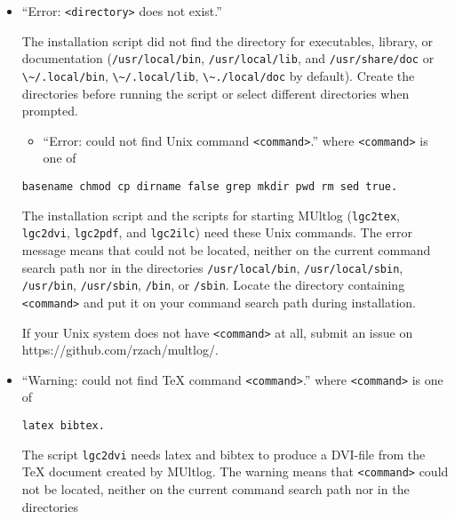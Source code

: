 \documentclass[
]{article}
\newcommand{\passthrough}[1]{#1}
\providecommand{\tightlist}{%
  \setlength{\itemsep}{0pt}\setlength{\parskip}{0pt}}
\begin{document}
\begin{itemize}
\item
  ``Error: \passthrough{\lstinline!<directory>!} does not exist.''

  The installation script did not find the directory for executables,
  library, or documentation (\passthrough{\lstinline!/usr/local/bin!},
  \passthrough{\lstinline!/usr/local/lib!}, and
  \passthrough{\lstinline!/usr/share/doc!} or
  \passthrough{\lstinline!\~/.local/bin!},
  \passthrough{\lstinline!\~/.local/lib!},
  \passthrough{\lstinline!\~./local/doc!} by default). Create the
  directories before running the script or select different directories
  when prompted.

  \begin{itemize}
  \tightlist
  \item
    ``Error: could not find Unix command
    \passthrough{\lstinline!<command>!}.'' where
    \passthrough{\lstinline!<command>!} is one of
  \end{itemize}

\begin{lstlisting}
basename chmod cp dirname false grep mkdir pwd rm sed true.
\end{lstlisting}

  The installation script and the scripts for starting MUltlog
  (\passthrough{\lstinline!lgc2tex!}, \passthrough{\lstinline!lgc2dvi!},
  \passthrough{\lstinline!lgc2pdf!}, and
  \passthrough{\lstinline!lgc2ilc!}) need these Unix commands. The error
  message means that could not be located, neither on the current
  command search path nor in the directories
  \passthrough{\lstinline!/usr/local/bin!},
  \passthrough{\lstinline!/usr/local/sbin!},
  \passthrough{\lstinline!/usr/bin!},
  \passthrough{\lstinline!/usr/sbin!}, \passthrough{\lstinline!/bin!},
  or \passthrough{\lstinline!/sbin!}. Locate the directory containing
  \passthrough{\lstinline!<command>!} and put it on your command search
  path during installation.

  If your Unix system does not have \passthrough{\lstinline!<command>!}
  at all, submit an issue on https://github.com/rzach/multlog/.
\item
  ``Warning: could not find TeX command
  \passthrough{\lstinline!<command>!}.'' where
  \passthrough{\lstinline!<command>!} is one of

\begin{lstlisting}
latex bibtex.
\end{lstlisting}

  The script \passthrough{\lstinline!lgc2dvi!} needs latex and bibtex to
  produce a DVI-file from the TeX document created by MUltlog. The
  warning means that \passthrough{\lstinline!<command>!} could not be
  located, neither on the current command search path nor in the
  directories


\end{itemize}
\end{document}
